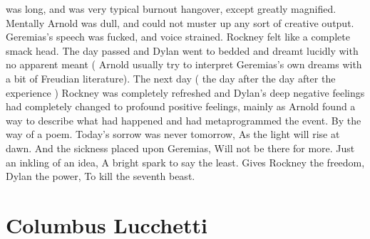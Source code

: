 \documentclass[12pt]{book}
\begin{document}
was long, and was very typical burnout hangover, except greatly magnified. Mentally Arnold was dull, and could not muster up any sort of creative output. Geremias's speech was fucked, and voice strained. Rockney felt like a complete smack head. The day passed and Dylan went to bedded and dreamt lucidly with no apparent meant ( Arnold usually try to interpret Geremias's own dreams with a bit of Freudian literature). The next day ( the day after the day after the experience ) Rockney was completely refreshed and Dylan's deep negative feelings had completely changed to profound positive feelings, mainly as Arnold found a way to describe what had happened and had metaprogrammed the event. By the way of a poem. Today's sorrow was never tomorrow, As the light will rise at dawn. And the sickness placed upon Geremias, Will not be there for more. Just an inkling of an idea, A bright spark to say the least. Gives Rockney the freedom, Dylan the power, To kill the seventh beast.



\chapter{Columbus Lucchetti}
\end{document}
